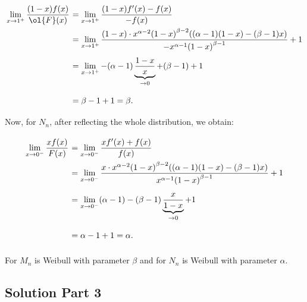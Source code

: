 \[ \everymath{\displaystyle}
\arraycolsep=1.8pt\def\arraystretch{2.5}
\begin{array}{rl}
    \lim_{x\to 1^+} \frac{(1-x)f(x)}{\ol{F}(x)} & = \lim_{x\to 1^+} \frac{(1-x)f'(x)- f(x)}{-f(x)}\\
    & = \lim_{x\to 1^+} \frac{(1-x) \cdot x^{\alpha-2}{(1-x)}^{\beta-2}((\alpha-1)(1-x)-(\beta-1)x)}{-x^{\alpha - 1}{(1-x)}^{\beta-1}} + 1\\
    & = \lim_{x\to 1^+} -(\alpha-1)\underbrace{\frac{1-x}{x}}_{\to 0}+(\beta-1) + 1\\
    & = \beta - 1 + 1 = \beta.
\end{array} \]
Now, for $N_n$, after reflecting the whole distribution, we obtain:
\[ \everymath{\displaystyle}
\arraycolsep=1.8pt\def\arraystretch{2.5}
\begin{array}{rl}
    \lim_{x\to 0^-} \frac{x f(x)}{F(x)}& = \lim_{x\to 0^-} \frac{xf'(x) + f(x)}{f(x)}\\
    & = \lim_{x\to 0^-} \frac{x \cdot x^{\alpha-2}{(1-x)}^{\beta-2}((\alpha-1)(1-x)-(\beta-1)x)}{x^{\alpha - 1}{(1-x)}^{\beta-1}} + 1\\
    & = \lim_{x\to 0^-} (\alpha - 1) - (\beta -1)\underbrace{\frac{x}{1-x}}_{\to 0} + 1\\
    & = \alpha - 1 + 1 = \alpha.
\end{array} \]

For $M_n$ is Weibull with parameter $\beta$ and for $N_n$ is Weibull with parameter $\alpha$.

\subsection*{Solution Part 3}

